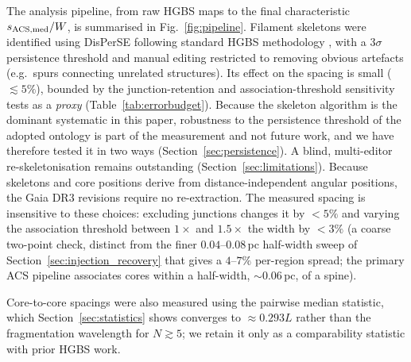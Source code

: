 \documentclass[usenatbib,twoside,twocolumn]{mnras}
\begin{document}
The analysis pipeline, from raw HGBS maps to the final characteristic $s_{\rm ACS,med}/W$, is summarised in Fig.~\ref{fig:pipeline}. Filament skeletons were identified using DisPerSE \citep{Sousbie2011} following standard HGBS methodology \citep{Arzoumanian2011}, with a $3\sigma$ persistence threshold and manual editing restricted to removing obvious artefacts (e.g.\ spurs connecting unrelated structures). Its effect on the spacing is small ($\lesssim5\%$), bounded by the junction-retention and association-threshold sensitivity tests as a \emph{proxy} (Table~\ref{tab:errorbudget}). Because the skeleton algorithm is the dominant systematic in this paper, robustness to the persistence threshold of the adopted ontology is part of the measurement and not future work, and we have therefore tested it in two ways (Section~\ref{sec:persistence}). A blind, multi-editor re-skeletonisation remains outstanding (Section~\ref{sec:limitations}). Because skeletons and core positions derive from distance-independent angular positions, the Gaia DR3 revisions require no re-extraction. The measured spacing is insensitive to these choices: excluding junctions changes it by $<5\%$ and varying the association threshold between $1\times$ and $1.5\times$ the width by $<3\%$ (a coarse two-point check, distinct from the finer $0.04$--$0.08$\,pc half-width sweep of Section~\ref{sec:injection_recovery} that gives a $4$--$7\%$ per-region spread; the primary ACS pipeline associates cores within a half-width, $\sim0.06$\,pc, of a spine).

Core-to-core spacings were also measured using the pairwise median statistic, which Section~\ref{sec:statistics} shows converges to $\approx0.293L$ rather than the fragmentation wavelength for $N\gtrsim5$; we retain it only as a comparability statistic with prior HGBS work.
\end{document}
